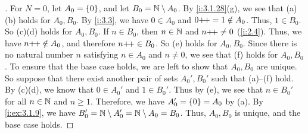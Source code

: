 \begin{proof}[]
  For \(N = 0\), let \(A_0 = \left\lbrace0\right\rbrace\), and let \(B_0 = \mathbb{N} \setminus A_0\).
  By \cref{i:3.1.28}(g), we see that (a)(b) holds for \(A_0, B_0\).
  By \cref{i:3.3}, we have \(0 \in A_0\) and \(0{+}\!{+} = 1 \notin A_0\).
  Thus, \(1 \in B_0\).
  So (c)(d) holds for \(A_0, B_0\).
  If \(n \in B_0\), then \(n \in \mathbb{N}\) and \(n{+}\!{+} \neq 0\) (\cref{i:2.4}).
  Thus, we have \(n{+}\!{+} \notin A_0\), and therefore \(n{+}\!{+} \in B_0\).
  So (e) holds for \(A_0, B_0\).
  Since there is no natural number \(n\) satisfying \(n \in A_0\) and \(n \neq 0\), we see that (f) holds for \(A_0, B_0\).
  To ensure that the base case holds, we are left to show that \(A_0, B_0\) are unique.
  So suppose that there exist another pair of sets \(A_0', B_0'\) such that (a)--(f) hold.
  By (c)(d), we know that \(0 \in A_0'\) and \(1 \in B_0'\).
  Thus by (e), we see that \(n \in B_0'\) for all \(n \in \mathbb{N}\) and \(n \geq 1\).
  Therefore, we have \(A_0' = \left\lbrace0\right\rbrace = A_0\) by (a).
  By \cref{i:ex:3.1.9}, we have \(B_0' = \mathbb{N} \setminus A_0' = \mathbb{N} \setminus A_0 = B_0\).
  Thus, \(A_0, B_0\) is unique, and the base case holds.


\end{proof}
